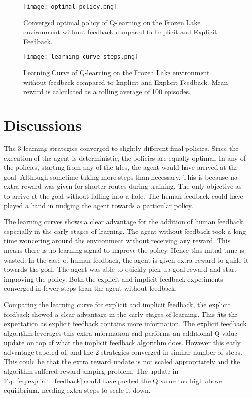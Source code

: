 \documentclass[conference]{IEEEtran}
\begin{document}
\begin{figure}
    \centering
    \texttt{[image: optimal\_policy.png]}
    \caption{Converged optimal policy of Q-learning on the Frozen Lake environment without feedback compared to Implicit and Explicit Feedback.}
    \label{fig:optimal_policy}
\end{figure}

\begin{figure}
    \centering
    \texttt{[image: learning\_curve\_steps.png]}
    \caption{Learning Curve of Q-learning on the Frozen Lake environment without feedback compared to Implicit and Explicit Feedback. Mean reward is calculated as a rolling average of 100 episodes.}
    \label{fig:learning_curve_steps}
\end{figure}

\section{Discussions}

The 3 learning strategies converged to slightly different final policies. Since the execution of the agent is deterministic, the policies are equally optimal. In any of the policies, starting from any of the tiles, the agent would have arrived at the goal. Although sometime taking more steps than necessary. This is because no extra reward was given for shorter routes during training. The only objective as to arrive at the goal without falling into a hole. The human feedback could have played a hand in nudging the agent towards a particular policy.

The learning curves shows a clear advantage for the addition of human feedback, especially in the early stages of learning. The agent without feedback took a long time wondering around the environment without receiving any reward. This means there is no learning signal to improve the policy. Hence this initial time is wasted. In the case of human feedback, the agent is given extra reward to guide it towards the goal. The agent was able to quickly pick up goal reward and start improving the policy. Both the explicit and implicit feedback experiments converged in fewer steps than the agent without feedback.

Comparing the learning curve for explicit and implicit feedback, the explicit feedback showed a clear advantage in the early stages of learning. This fits the expectation as explicit feedback contains more information. The explicit feedback algorithm leverages this extra information and performs an additional Q value update on top of what the implicit feedback algorithm does.
However this early advantage tapered off and the 2 strategies converged in similar number of steps. This could be that the extra reward update is not scaled appropriately and the algorithm suffered reward shaping problem. The update in Eq.~\ref{eq:explicit_feedback} could have pushed the Q value too high above equilibrium, needing extra steps to scale it down.
\end{document}
